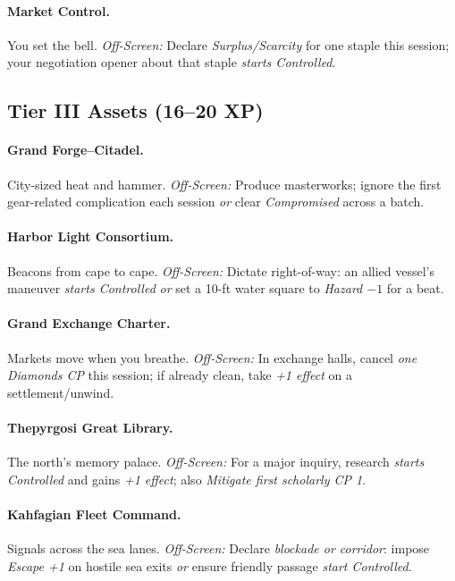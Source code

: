 \documentclass[11pt]{article}
\begin{document}
\paragraph{Market Control.} You set the bell.
\emph{Off-Screen:} Declare \emph{Surplus/Scarcity} for one staple this session; your negotiation opener about that staple \emph{starts Controlled}.

\subsection*{Tier III Assets (16–20 XP)}
\paragraph{Grand Forge–Citadel.} City-sized heat and hammer.
\emph{Off-Screen:} Produce masterworks; ignore the first gear-related complication each session \emph{or} clear \emph{Compromised} across a batch.

\paragraph{Harbor Light Consortium.} Beacons from cape to cape.
\emph{Off-Screen:} Dictate right-of-way: an allied vessel’s maneuver \emph{starts Controlled} \emph{or} set a 10-ft water square to \emph{Hazard $-1$} for a beat.

\paragraph{Grand Exchange Charter.} Markets move when you breathe.
\emph{Off-Screen:} In exchange halls, cancel \emph{one Diamonds CP} this session; if already clean, take \emph{+1 effect} on a settlement/unwind.

\paragraph{Thepyrgosi Great Library.} The north’s memory palace.
\emph{Off-Screen:} For a major inquiry, research \emph{starts Controlled} and gains \emph{+1 effect}; also \emph{Mitigate first scholarly CP 1}.

\paragraph{Kahfagian Fleet Command.} Signals across the sea lanes.
\emph{Off-Screen:} Declare \emph{blockade or corridor}: impose \emph{Escape +1} on hostile sea exits \emph{or} ensure friendly passage \emph{start Controlled}.
\end{document}
